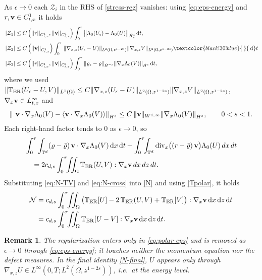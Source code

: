 \documentclass[12pt,a4paper,twoside]{article}
\newcommand{\vr}{\varrho}
\newcommand{\vv}{\vc{v}}
\newcommand{\vc}[1]{{\bf #1}}
\newcommand{\dx}{{\,\rm d} {x}}
\newcommand{\dt}{{\,\rm d} t }
\newcommand{\lr}[1]{\left( #1 \right)}
\newtheorem{rmk}{Remark}
\numberwithin{equation}{section}%
\newcommand{\T}{\mathbb{T}}
\newcommand{\Om}{\Omega}
\newcommand{\dz}{{\rm d} z}
\newcommand{\Gradx}{\nabla_x}
\newcommand{\Gradxz}{\nabla_{x,z}}
\newcommand{\Divx}{\operatorname{div}_x}
\newcommand{\Lambdaz}{\Lambda_0}
\newcommand{\tcbb}{\textcolor{black!30!blue}}
\begin{document}
\begin{pf}
As $\epsilon\to0$ each $\mathcal Z_i$ in the RHS of \eqref{stress-reg} vanishes: using \eqref{eq:eps-energy} and $r,\vv\in C^1_{t,x}$ it holds
\begin{align*}
	&	\left| \mathcal{Z}_1\right|  \leq C \lr{ || r ||_{C^1_{t,x}} , || \vv||_{C^1_{t,x}} } \int_0^\tau \big\|\Lambdaz(U_\epsilon)-\Lambdaz(U)\big\|_{\dot H^{s}_x}  \dt,\\
	&	\left| \mathcal{Z}_2\right|  \leq C \lr{  || \vv||_{C^1_{t,x}} } \int_0^\tau \|\Gradxz(U_\epsilon-U)\|_{L^2(\Om,z^{1-2s})}\|\Gradxz V\|_{L^2(\Om,z^{1-2s})}\tcbb{\,}\dt  \\
	&\left| \mathcal{Z}_3\right|  \leq C \lr{ || r ||_{C^1_{t,x} }, || \vv||_{C^1_{t,x}} } \int_0^\tau \|\vr_\epsilon-\vr\|_{\dot H^{-s}} || \Gradx\Lambdaz(V) ||_{\dot H^{s}}  \dt ,
\end{align*}
where we used 
$\|\T_{\rm ER}(U_\epsilon-U,V)\|_{L^1(\Omega)} \leq C  \|\Gradxz(U_\epsilon-U)\|_{L^2(\Om,z^{1-2s})}\|\Gradxz V\|_{L^2(\Om,z^{1-2s})}$,\;
$\Gradx\vv\in L^\infty_{t,x}$ and 
\[
\|\ \vv\cdot\Gradx\Lambdaz(V) - \langle \vv\cdot\Gradx\Lambdaz(V) \rangle  \|_{\dot H^s}
\le
C\,\|\vv \|_{W^{1,\infty}}
\|\Gradx\Lambdaz(V)\|_{\dot H^s},
\qquad 0<s<1.
\] Each right-hand factor tends to $0$ as $\epsilon\to0$, so
\begin{align}\label{eq:N-cross}
	&\int_0^\tau \int_{\mathbb T^d}(\vr-\bar\vr)\,\vv\cdot\Gradx\Lambdaz(V) \dx \dt
	+\int_0^\tau\!\!\int_{\mathbb T^d}\Divx\!\big((r-\bar\vr)\,\vv\big)\Lambdaz(U)\,dx\,dt \nonumber\\
	&\quad 		=2c_{d,s}\int_0^\tau\!\!\iint_\Omega\T_{\rm ER}(U,V):\Gradx\vv\,dx\,dz\,dt .
\end{align}
Substituting \eqref{eq:N-TV} and \eqref{eq:N-cross} into \eqref{N} and using \eqref{Tpolar}, it holds
\begin{align*}
	\mathcal N
	&=c_{d,s}\int_0^\tau\!\!\iint_\Omega\big(\T_{\rm ER}[U]-2\,\T_{\rm ER}(U,V)+\T_{\rm ER}[V]\big):\Gradx\vv \dx \,\dz \dt \\
	&=c_{d,s}\int_0^\tau\!\!\iint_\Omega\T_{\rm ER}[U-V]:\Gradx\vv \dx \,\dz\dt.
\end{align*}

\end{pf}

\begin{rmk}\label{rem:reg-scope}
	The regularization enters only in \eqref{eq:polar-eps} and is removed as $\epsilon\to0$ through
	\eqref{eq:eps-energy}; it touches neither the momentum equation nor the defect measures. In the
	final identity \eqref{N-final}, $U$ appears only through $\Gradxz U\in L^\infty(0,T;L^2(\Omega,z^{1-2s}))$,
	i.e.\ at the energy level.
\end{rmk}
\end{document}
